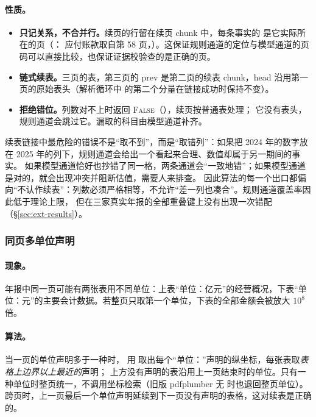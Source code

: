 \paragraph{性质。}
\begin{itemize}
\item \textbf{只记关系，不合并行。}续页的行留在续页 chunk 中，每条事实的  是它实际所在的页（：
      应付账款取自第 58 页，）。这保证规则通道的定位与模型通道的页码可以直接比较，也保证证据校验查的是正确的页。
\item \textbf{链式续表。}三页的表，第三页的 prev 是第二页的续表 chunk，head 沿用第一页的原始表头（解析循环中  的第二个分量在链接成功时保持不变）。
\item \textbf{拒绝错位。}列数对不上时返回 \textsc{False}（），续页按普通表处理；
      它没有表头，规则通道会跳过它。漏取的科目由模型通道补齐。
\end{itemize}

\begin{tradeoff}[：续表上漏取 vs.\ 错配]
续表链接中最危险的错误不是“取不到”，而是“取错列”：如果把 2024 年的数字放在 2025 年的列下，规则通道会给出一个看起来合理、数值却属于另一期间的事实。
如果模型通道恰好也抄错了同一格，两条通道会“一致地错”；如果模型通道是对的，就会出现冲突并阻断估值，需要人来排查。
因此算法的每一个出口都偏向“不认作续表”：列数必须严格相等，不允许“差一列也凑合”。规则通道覆盖率因此低于理论上限，
但在三家真实年报的全部重叠键上没有出现一次错配（\S\ref{sec:ext-results}）。
\end{tradeoff}

\subsubsection{同页多单位声明}
\label{sec:ext-units}

\paragraph{现象。}
年报中同一页可能有两张表用不同单位：上表“单位：亿元”的经营概况，下表“单位：元”的主要会计数据。若整页只取第一个单位，下表的全部金额会被放大 $10^8$ 倍。

\paragraph{算法。}
当一页的单位声明多于一种时， 用  取出每个“单位：”声明的纵坐标，每张表取\emph{表格上边界以上最近的}声明；
上方没有声明的表沿用上一页结束时的单位。只有一种单位时整页统一，不调用坐标检索（旧版 pdfplumber 无  时也退回整页单位）。
跨页时，上一页最后一个单位声明延续到下一页没有声明的表格，这对续表是正确的。

